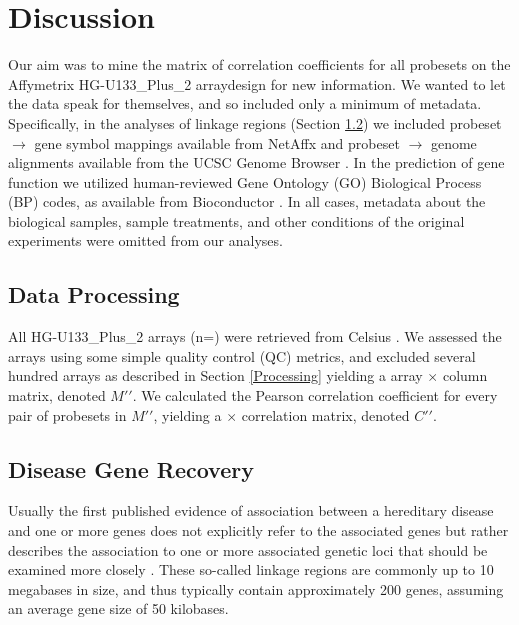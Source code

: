 \documentclass{bioinfo}
\begin{document}
\section{Discussion}\label{Discussion}

Our aim was to mine the matrix of correlation coefficients for all probesets on
the Affymetrix HG-U133\_Plus\_2 arraydesign for new information.  We wanted to
let the data speak for themselves, and so included only a minimum of metadata.
Specifically, in the analyses of linkage regions (Section \ref{Recovery}) we
included probeset $\rightarrow$ gene symbol mappings available from NetAffx
\cite{netaffx} and probeset $\rightarrow$ genome alignments available from the UCSC
Genome Browser \cite{karolchik}.  In the prediction of gene function we
utilized human-reviewed Gene Ontology (GO) Biological Process (BP) codes, as
available from Bioconductor \cite{go,bioconductor}.  In all cases, metadata
about the biological samples, sample treatments, and other conditions of the
original experiments were omitted from our analyses.

\subsection{Data Processing}\label{Processing Results}

All HG-U133\_Plus\_2 arrays (n=) were retrieved from Celsius
\cite{celsius}.  We assessed the arrays using some simple quality control (QC)
metrics, and excluded several hundred arrays as described in Section
\ref{Processing} yielding a  array $\times$  column
matrix, denoted $M\prime\prime$.  We calculated the Pearson correlation
coefficient for every pair of probesets in $M\prime\prime$, yielding a
 $\times$  correlation matrix, denoted
$C\prime\prime$.

\subsection{Disease Gene Recovery}\label{Recovery}

Usually the first published evidence of association between a hereditary
disease and one or more genes does not explicitly refer to the associated genes
but rather describes the association to one or more associated genetic loci
that should be examined more closely \cite{joubert,microcephaly}.  These
so-called linkage regions are commonly up to 10 megabases in size, and thus
typically contain approximately 200 genes, assuming an average gene size of 50
kilobases.
\end{document}
